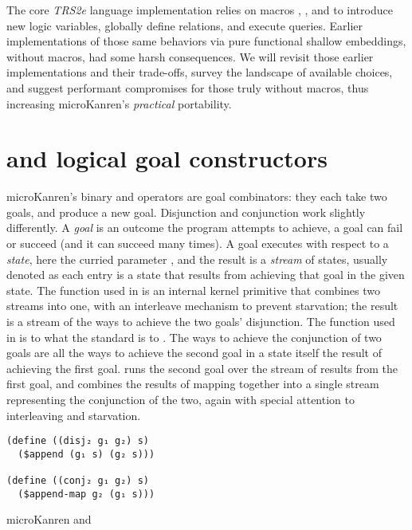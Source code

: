\documentclass[sigplan,draft,balance,pbalance,natbib=false]{acmart}
\begin{document}
The core \emph{TRS2e} language implementation relies on
macros , , and 
to introduce new logic variables, globally define relations, and
execute queries. Earlier implementations of those same behaviors via
pure functional shallow embeddings, without macros, had some harsh
consequences. We will revisit those earlier implementations and their
trade-offs, survey the landscape of available choices, and suggest
performant compromises for those truly without macros, thus increasing
microKanren's \emph{practical} portability.

\section{ and  logical goal
  constructors}\label{sec:conde}

microKanren's binary  and 
operators are goal combinators: they each take two goals, and produce
a new goal. Disjunction and conjunction work slightly differently. A
\emph{goal} is an outcome the program attempts to achieve, a goal can
fail or succeed (and it can succeed many times). A goal executes with
respect to a \emph{state}, here the curried parameter ,
and the result is a \emph{stream} of states, usually
denoted  as each entry is a state that results from
achieving that goal in the given state. The
 function used in  is an
internal kernel primitive that combines two streams into one, with an
interleave mechanism to prevent starvation; the result is a stream of
the ways to achieve the two goals' disjunction.
The  function used in  is
to
 what the standard  is
to . The ways to achieve the conjunction of two
goals are all the ways to achieve the second goal in a state itself
the result of achieving the first goal.\@ {}
runs the second goal over the stream of results from the first goal,
and combines the results of mapping together into a single stream
representing the conjunction of the two, again with special attention
to interleaving and starvation.

\begin{listing}
  \begin{verbatim}
(define ((disj₂ g₁ g₂) s)
  ($append (g₁ s) (g₂ s)))

(define ((conj₂ g₁ g₂) s)
  ($append-map g₂ (g₁ s)))
  \end{verbatim}
  \caption{microKanren  and }
  \label{mnt:disj2-conj2}
\end{listing}
\end{document}
